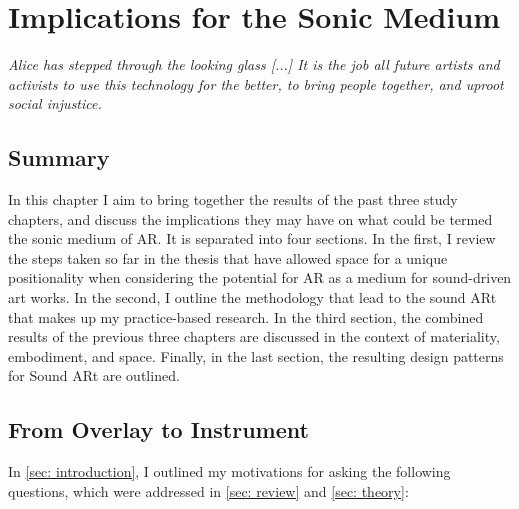 \chapter{Implications for the Sonic Medium}
\label{sec: discussion}
\epigraph{\emph{Alice has stepped through the looking glass [...] It is the job all future artists and activists to use this technology for the better, to bring people together, and uproot social injustice.}}{\citep[]{skwarek2018}}


\clearpage
\section{Summary}\label{sec: discussion-summary}
In this chapter I aim to bring together the results of the past three study chapters, and discuss the implications they may have on what could be termed the sonic medium of AR. It is separated into four sections. In the first, I review the steps taken so far in the thesis that have allowed space for a unique positionality when considering the potential for AR as a medium for sound-driven art works. In the second, I outline the methodology that lead to the sound ARt that makes up my practice-based research. In the third section, the combined results of the previous three chapters are discussed in the context of materiality, embodiment, and space. Finally, in the last section, the resulting design patterns for Sound ARt are outlined.
\section{From Overlay to Instrument} \label{sec: discussion-review}
In \autoref{sec: introduction}, I outlined my motivations for asking the following questions, which were addressed in \autoref{sec: review} and \autoref{sec: theory}: 

